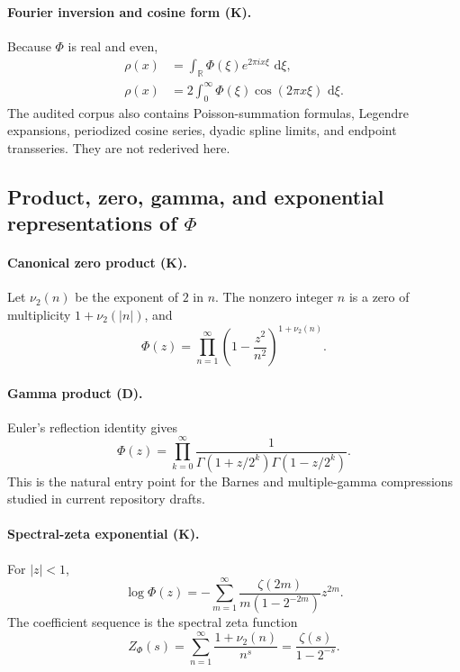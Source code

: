 \documentclass[11pt]{article}
\theoremstyle{definition}
\theoremstyle{remark}
\newcommand{\R}{\mathbb R}
\newcommand{\dd}{\,\mathrm d}
\newcommand{\statusknown}{\textsf{K}}
\newcommand{\statusderived}{\textsf{D}}
\begin{document}
\paragraph{Fourier inversion and cosine form (\statusknown).}
Because \(\Phi\) is real and even,
\begin{align}
 \rho(x)&=\int_{\R}\Phi(\xi)e^{2\pi i x\xi}\,\dd\xi,
                                                                  \label{eq:rho-fourier-inversion}\\
 \rho(x)&=2\int_0^{\infty}\Phi(\xi)\cos(2\pi x\xi)\,\dd\xi.
                                                                  \label{eq:rho-cosine}
\end{align}
The audited corpus also contains Poisson-summation formulas, Legendre expansions,
periodized cosine series, dyadic spline limits, and endpoint transseries.  They are not
rederived here.

\subsection{Product, zero, gamma, and exponential representations of \(\Phi\)}

\paragraph{Canonical zero product (\statusknown).}
Let \(\nu_2(n)\) be the exponent of \(2\) in \(n\).  The nonzero integer \(n\) is a zero of
multiplicity \(1+\nu_2(|n|)\), and
\begin{equation}
 \Phi(z)=\prod_{n=1}^{\infty}
 \left(1-\frac{z^2}{n^2}\right)^{1+\nu_2(n)}.                \label{eq:canonical-product}
\end{equation}

\paragraph{Gamma product (\statusderived).}
Euler's reflection identity gives
\begin{equation}
 \Phi(z)=\prod_{k=0}^{\infty}
 \frac{1}{\Gamma(1+z/2^k)\Gamma(1-z/2^k)}.                  \label{eq:gamma-product}
\end{equation}
This is the natural entry point for the Barnes and multiple-gamma compressions studied in
current repository drafts.

\paragraph{Spectral-zeta exponential (\statusknown).}
For \(|z|<1\),
\begin{equation}
 \log\Phi(z)
 =-\sum_{m=1}^{\infty}
 \frac{\zeta(2m)}{m(1-2^{-2m})}z^{2m}.                       \label{eq:logPhi-zeta}
\end{equation}
The coefficient sequence is the spectral zeta function
\begin{equation}
 Z_{\Phi}(s)=\sum_{n=1}^{\infty}\frac{1+\nu_2(n)}{n^s}
 =\frac{\zeta(s)}{1-2^{-s}}.                                \label{eq:spectral-zeta}
\end{equation}
\end{document}
